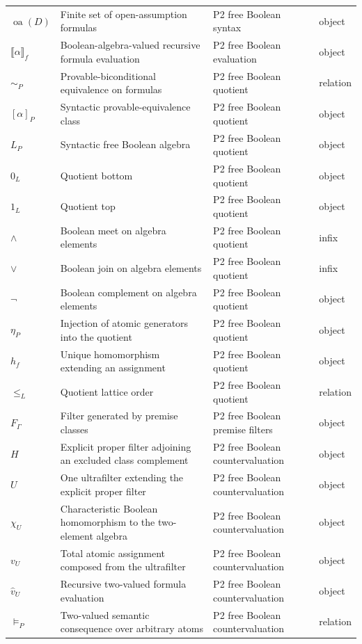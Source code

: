 \begin{longtable}{@{}p{}p{}p{}p{}@{}}
\(\operatorname{oa}(D)\) & Finite set of open-assumption formulas & P2 free Boolean syntax & object \\
\(\llbracket\alpha\rrbracket_f\) & Boolean-algebra-valued recursive formula evaluation & P2 free Boolean evaluation & object \\
\(\sim_P\) & Provable-biconditional equivalence on formulas & P2 free Boolean quotient & relation \\
\([\alpha]_P\) & Syntactic provable-equivalence class & P2 free Boolean quotient & object \\
\(L_P\) & Syntactic free Boolean algebra & P2 free Boolean quotient & object \\
\(0_L\) & Quotient bottom & P2 free Boolean quotient & object \\
\(1_L\) & Quotient top & P2 free Boolean quotient & object \\
\(\wedge\) & Boolean meet on algebra elements & P2 free Boolean quotient & infix \\
\(\vee\) & Boolean join on algebra elements & P2 free Boolean quotient & infix \\
\(\neg\) & Boolean complement on algebra elements & P2 free Boolean quotient & object \\
\(\eta_P\) & Injection of atomic generators into the quotient & P2 free Boolean quotient & object \\
\(h_f\) & Unique homomorphism extending an assignment & P2 free Boolean quotient & object \\
\(\leq_L\) & Quotient lattice order & P2 free Boolean quotient & relation \\
\(F_\Gamma\) & Filter generated by premise classes & P2 free Boolean premise filters & object \\
\(H\) & Explicit proper filter adjoining an excluded class complement & P2 free Boolean countervaluation & object \\
\(U\) & One ultrafilter extending the explicit proper filter & P2 free Boolean countervaluation & object \\
\(\chi_U\) & Characteristic Boolean homomorphism to the two-element algebra & P2 free Boolean countervaluation & object \\
\(v_U\) & Total atomic assignment composed from the ultrafilter & P2 free Boolean countervaluation & object \\
\(\widehat v_U\) & Recursive two-valued formula evaluation & P2 free Boolean countervaluation & object \\
\(\models_P\) & Two-valued semantic consequence over arbitrary atoms & P2 free Boolean countervaluation & relation \\

\end{longtable}
